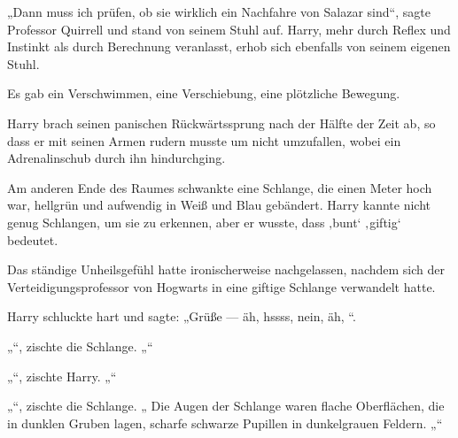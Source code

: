 „Dann muss ich prüfen, ob sie wirklich ein Nachfahre von Salazar sind“, sagte Professor Quirrell und stand von seinem Stuhl auf. Harry, mehr durch Reflex und Instinkt als durch Berechnung veranlasst, erhob sich ebenfalls von seinem eigenen Stuhl.

Es gab ein Verschwimmen, eine Verschiebung, eine plötzliche Bewegung.

Harry brach seinen panischen Rückwärtssprung nach der Hälfte der Zeit ab, so dass er mit seinen Armen rudern musste um nicht umzufallen, wobei ein Adrenalinschub durch ihn hindurchging.

Am anderen Ende des Raumes schwankte eine Schlange, die einen Meter hoch war, hellgrün und aufwendig in Weiß und Blau gebändert. Harry kannte nicht genug Schlangen, um sie zu erkennen, aber er wusste, dass ‚bunt‘ ‚giftig‘ bedeutet.

Das ständige Unheilsgefühl hatte ironischerweise nachgelassen, nachdem sich der Verteidigungsprofessor von Hogwarts in eine giftige Schlange verwandelt hatte.

Harry schluckte hart und sagte:
„Grüße — äh, hssss, nein, äh, “.

„“, zischte die Schlange. „“

„“, zischte Harry. „“

„“, zischte die Schlange. „ Die Augen der Schlange waren flache Oberflächen, die in dunklen Gruben lagen, scharfe schwarze Pupillen in dunkelgrauen Feldern. „“

